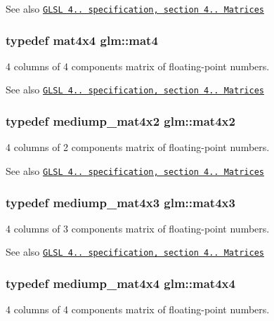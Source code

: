 \begin{DoxySeeAlso}{\-See also}
\href{http://www.opengl.org/registry/doc/GLSLangSpec.4.20.8.pdf}{\tt \-G\-L\-S\-L 4.. specification, section 4.. \-Matrices} 
\end{DoxySeeAlso}
\hypertarget{group__core__types_ga7dcd2365c2e368e6af5b7adeb6a9c8df}{
\subsubsection[{mat4}]{\setlength{\rightskip}{0pt plus 5cm}typedef mat4x4 {\bf glm\-::mat4}}}\label{group__core__types_ga7dcd2365c2e368e6af5b7adeb6a9c8df}
4 columns of 4 components matrix of floating-\/point numbers.

\begin{DoxySeeAlso}{\-See also}
\href{http://www.opengl.org/registry/doc/GLSLangSpec.4.20.8.pdf}{\tt \-G\-L\-S\-L 4.. specification, section 4.. \-Matrices} 
\end{DoxySeeAlso}
\hypertarget{group__core__types_gaf8b375fbef797b3730fcddc7bd60b59f}{
\subsubsection[{mat4x2}]{\setlength{\rightskip}{0pt plus 5cm}typedef mediump\-\_\-mat4x2 {\bf glm\-::mat4x2}}}\label{group__core__types_gaf8b375fbef797b3730fcddc7bd60b59f}
4 columns of 2 components matrix of floating-\/point numbers.

\begin{DoxySeeAlso}{\-See also}
\href{http://www.opengl.org/registry/doc/GLSLangSpec.4.20.8.pdf}{\tt \-G\-L\-S\-L 4.. specification, section 4.. \-Matrices} 
\end{DoxySeeAlso}
\hypertarget{group__core__types_ga605b649496ad53379e8ac6d7a4534667}{
\subsubsection[{mat4x3}]{\setlength{\rightskip}{0pt plus 5cm}typedef mediump\-\_\-mat4x3 {\bf glm\-::mat4x3}}}\label{group__core__types_ga605b649496ad53379e8ac6d7a4534667}
4 columns of 3 components matrix of floating-\/point numbers.

\begin{DoxySeeAlso}{\-See also}
\href{http://www.opengl.org/registry/doc/GLSLangSpec.4.20.8.pdf}{\tt \-G\-L\-S\-L 4.. specification, section 4.. \-Matrices} 
\end{DoxySeeAlso}
\hypertarget{group__core__types_gafe3341c717b9f9725019a10fd1dcf9c1}{
\subsubsection[{mat4x4}]{\setlength{\rightskip}{0pt plus 5cm}typedef mediump\-\_\-mat4x4 {\bf glm\-::mat4x4}}}\label{group__core__types_gafe3341c717b9f9725019a10fd1dcf9c1}
4 columns of 4 components matrix of floating-\/point numbers.

